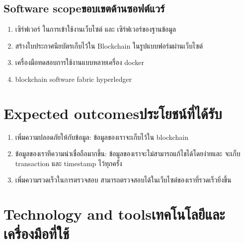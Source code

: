 \subsection{\ifenglish Software scope\else ขอบเขตด้านซอฟต์แวร์\fi}
\begin{enumerate}
    \item เซิร์ฟเวอร์ ในการเข้าใช้งานเว็บไซต์ และ เซิร์ฟเวอร์ของฐานข้อมูล
    \item สร้างใบประกาศนียบัตรเก็บไว้ใน Blockchain ในรูปแบบฟอร์มผ่านเว็บไซต์
    \item เครื่องมือทดสอบการใช้งานแบบหลายเครื่อง docker
    \item blockchain software fabric hyperledger
\end{enumerate}
\section{\ifenglish Expected outcomes\else ประโยชน์ที่ได้รับ\fi}
\begin{enumerate}
    \item เพิ่มความปลอดภัยให้กับข้อมูล: ข้อมูลของเราจะเก็บไว้ใน blockchain
    \item ข้อมูลของเราทีความน่าเชื่อถือมากขึ้น: ข้อมูลของเราจะไม่สามารถแก้ไขได้โดยง่ายและ
    จะเก็บ transaction และ timestamp ไว้ทุกครั้ง
    \item เพิ่มความรวดเร็วในการตรวจสอบ สามารถตรวจสอบได้ในเว็บไซต์ของเราที่รวดเร็วยิ่งขึ้น
\end{enumerate}
\section{\ifenglish Technology and tools\else เทคโนโลยีและเครื่องมือที่ใช้\fi}

